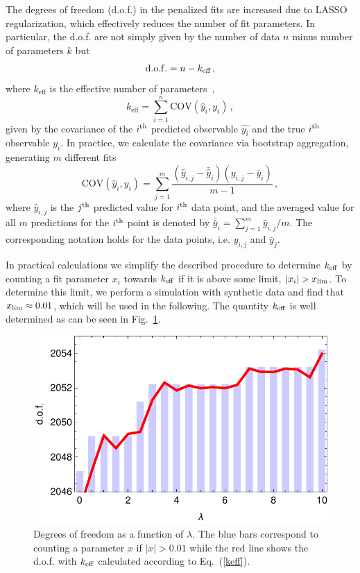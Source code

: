 \documentclass[10pt,aps,prc,superscriptaddress,twoside,twocolumn,nofootinbib,showpacs,preprintnumbers]{revtex4-1}
\begin{document}
The degrees of freedom (d.o.f.) in the penalized fits are increased due to LASSO regularization, which effectively reduces the number of fit parameters. In particular, the d.o.f. are not simply given by the number of data $n$ minus number of parameters $k$ but
\begin{equation}
{\rm d.o.f.}=n-k_\text{eff}\,,
\end{equation}
where $k_\text{eff}$ is the effective number of parameters~\cite{hastie_hastie_tibshirani_friedman_2001},
\begin{equation}
k_{\text{eff}}=\sum_{i=1}^{n} \text{COV}(\hat{y}_i,y_i)\,,
\label{keff}
\end{equation}
given by the covariance of the $i^{\rm th}$ predicted observable $\hat{y_i}$ and the true $i^{\rm th}$ observable  $y_i$.
In practice, we calculate the covariance via bootstrap aggregation, generating $m$ different fits
\begin{equation}
\text{COV}(\hat{y}_i,y_i) = \sum_{j=1}^{m} \frac{(\hat{y}_{i,j} - \bar{\hat{y}}_i)(y_{i,j} - \bar{y}_i)}{m-1}\,,
\end{equation}
where $\hat{y}_{i,j}$ is the $j^{\rm th}$ predicted value for $i^{\rm th}$ data point, and the averaged value for all $m$ predictions for the $i^{\rm th}$ point is denoted by $\bar{\hat{y}}_i= \sum_{j=1}^{m} \hat{y}_{i,j}/m$. The corresponding notation holds for the data points, i.e. $y_{i,j}$ and $\bar y_{j}$.

In practical calculations we simplify the described procedure to  determine $k_{\rm eff}$ by counting a fit parameter $x_i$ towards $k_{\rm eff}$ if
it is above some limit, $|x_i|>x_{\rm lim}$. To determine this limit, we perform a simulation with synthetic data and find that $x_{\rm lim}\approx 0.01$, which will be used in the following. The quantity $k_{\rm eff}$ is well determined as can be seen in Fig.~\ref{fig:Fig4}.


\begin{figure}
\begin{center}
\includegraphics[width=0.9\linewidth,trim=0.5cm 1cm 0.5cm 0cm]{FIG-DOFalt.pdf}
\end{center}
\caption{%
Degrees of freedom as a function of $\lambda$. The blue bars correspond to counting a parameter $x$ if $|x|>0.01$ while the red line shows the d.o.f. with $k_{\rm eff}$ calculated according to  Eq.~(\ref{keff}).}
\label{fig:Fig4}
\end{figure}
\end{document}
